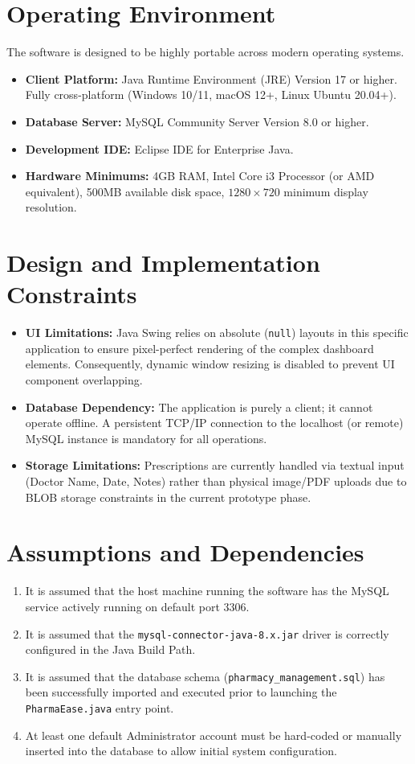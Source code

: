 \documentclass[12pt,a4paper]{report}
\begin{document}
\section{Operating Environment}
The software is designed to be highly portable across modern operating systems.
\begin{itemize}
    \item \textbf{Client Platform:} Java Runtime Environment (JRE) Version 17 or higher. Fully cross-platform (Windows 10/11, macOS 12+, Linux Ubuntu 20.04+).
    \item \textbf{Database Server:} MySQL Community Server Version 8.0 or higher.
    \item \textbf{Development IDE:} Eclipse IDE for Enterprise Java.
    \item \textbf{Hardware Minimums:} 4GB RAM, Intel Core i3 Processor (or AMD equivalent), 500MB available disk space, $1280 \times 720$ minimum display resolution.
\end{itemize}

\section{Design and Implementation Constraints}
\begin{itemize}
    \item \textbf{UI Limitations:} Java Swing relies on absolute (\texttt{null}) layouts in this specific application to ensure pixel-perfect rendering of the complex dashboard elements. Consequently, dynamic window resizing is disabled to prevent UI component overlapping.
    \item \textbf{Database Dependency:} The application is purely a client; it cannot operate offline. A persistent TCP/IP connection to the localhost (or remote) MySQL instance is mandatory for all operations.
    \item \textbf{Storage Limitations:} Prescriptions are currently handled via textual input (Doctor Name, Date, Notes) rather than physical image/PDF uploads due to BLOB storage constraints in the current prototype phase.
\end{itemize}

\section{Assumptions and Dependencies}
\begin{enumerate}
    \item It is assumed that the host machine running the software has the MySQL service actively running on default port 3306.
    \item It is assumed that the \texttt{mysql-connector-java-8.x.jar} driver is correctly configured in the Java Build Path.
    \item It is assumed that the database schema (\texttt{pharmacy\_management.sql}) has been successfully imported and executed prior to launching the \texttt{PharmaEase.java} entry point.
    \item At least one default Administrator account must be hard-coded or manually inserted into the database to allow initial system configuration.
\end{enumerate}
\end{document}
